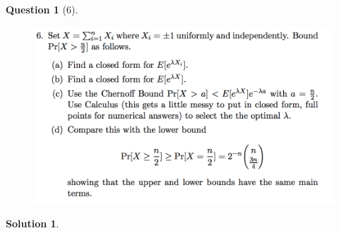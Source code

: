 \documentclass{article} %
\theoremstyle{quest}
\newtheorem*{question}{Question}
\newtheorem*{solution}{Solution}
\begin{document}
\newpage

\begin{question}[6]
\hfill
\begin{figure}[h!]
  \centering
    \includegraphics[width=1\textwidth]{PM-2-6.png}
\end{figure}
\end{question}
\begin{solution}
 
\end{solution}
\end{document}
